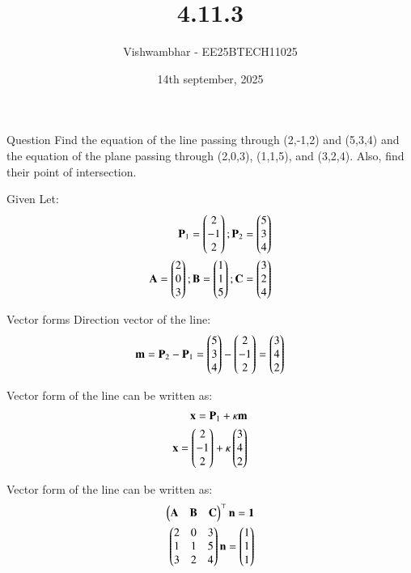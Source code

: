 \documentclass{beamer}
\title{4.11.3}
\date{14th september, 2025}
\author{Vishwambhar - EE25BTECH11025}
\begin{document}
\frame{\titlepage}
\begin{frame}{Question}
Find the equation of the line passing through (2,-1,2) and (5,3,4) and the equation of the plane passing through (2,0,3), (1,1,5), and (3,2,4). Also, find their point of intersection.
\end{frame}

\begin{frame}{Given}
Let:
\begin{align}
    \mathbf{P}_1=\begin{pmatrix}2\\-1\\2\end{pmatrix};
    \mathbf{P}_2=\begin{pmatrix}5\\3\\4\end{pmatrix}\\
    \mathbf{A}=\begin{pmatrix}2\\0\\3\end{pmatrix};\mathbf{B}=\begin{pmatrix}1\\1\\5\end{pmatrix};\mathbf{C}=\begin{pmatrix}3\\2\\4\end{pmatrix}    
\end{align}
\end{frame}

\begin{frame}{Vector forms}
Direction vector of the line:
\begin{align}
    \mathbf{m}=\mathbf{P}_2-\mathbf{P}_1=\begin{pmatrix}5\\3\\4\end{pmatrix}-\begin{pmatrix}2\\-1\\2\end{pmatrix}=\begin{pmatrix}3\\4\\2\end{pmatrix}
\end{align}

Vector form of the line can be written as:
\begin{align}
    \mathbf{x}=\mathbf{P}_1+\kappa\mathbf{m}\\
    \mathbf{x}=\begin{pmatrix}2\\-1\\2\end{pmatrix}+\kappa\begin{pmatrix}3\\4\\2\end{pmatrix}
\end{align}

Vector form of the line can be written as:
\begin{align}
    \begin{pmatrix}\mathbf{A}&\mathbf{B}&\mathbf{C}\end{pmatrix}^\top\mathbf{n}=\mathbf{1}\\
    \begin{pmatrix}2&0&3\\1&1&5\\3&2&4\end{pmatrix}\mathbf{n}=\begin{pmatrix}1\\1\\1\end{pmatrix}
\end{align}
\end{frame}
\end{document}
